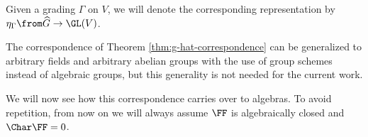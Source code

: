 \begin{notation}
	Given a grading $\Gamma$ on $V$, we will denote the corresponding representation by $\eta_\Gamma\from \widehat G \to \GL(V)$.
\end{notation}

\begin{remark}
	The correspondence of Theorem \ref{thm:g-hat-correspondence} can be generalized to arbitrary fields and arbitrary abelian groups with the use of group schemes instead of algebraic groups, but this generality is not needed for the current work.
\end{remark}

We will now see how this correspondence carries over to algebras.
To avoid repetition, from now on we will always assume $\FF$ is algebraically closed and $\Char \FF = 0$.








